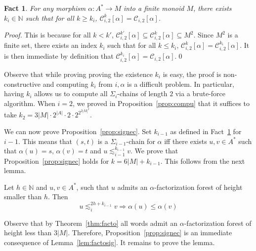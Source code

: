 \documentclass[envcountsame]{llncs}
\newcommand\nat{\ensuremath{\mathbb{N}}\xspace}
\newcommand\Cs{\ensuremath{\mathcal{C}}\xspace}
\newcommand\Csgen[3]{\ensuremath{\Cs_{#1,#3}^{#2}}\xspace}
\newcommand\Csitwo{\ensuremath{\Cs_{i,2}}\xspace}
\newcommand{\sic}[1]{\ensuremath{\Sigma_{#1}}\xspace}
\newcommand\sieq[2]{\ensuremath{\lesssim^{#1}_{#2}}\xspace}
\newcommand\lmo{\ensuremath{\leqslant}\xspace}
\let\leq\leqslant
\let\geq\geqslant
\newcommand\qchain[1]{\ensuremath{\sic{#1}}-chain\xspace}
\newcommand\qchains[1]{\ensuremath{\sic{#1}}-chains\xspace}
\newcommand\ichains{\qchains{i}}
\newtheorem{fact}[theorem]{Fact}
\begin{document}
\begin{fact} \label{fct:boundk}
  For any morphism $\alpha: A^* \rightarrow M$ into a finite monoid $M$,
  there exists $k_i \in \nat$ such that for all $k \geq k_i$,
  $\Csgen{i}{k}{2}[\alpha] = \Csitwo[\alpha]$.
\end{fact}

\begin{proof}
  This is because for all $k < k'$, $\Csgen{i}{k'}{2}[\alpha] \subseteq
  \Csgen{i}{k}{2}[\alpha] \subseteq M^2$. Since $M^2$ is a finite set, there
  exists an index $k_i$ such that for all $k \leq k_i$,
  $\Csgen{i}{k}{2}[\alpha] = \Csgen{i}{k_i}{2}[\alpha]$. It is then
  immediate by definition that $\Csgen{i}{k_i}{2}[\alpha] = \Csitwo[\alpha]$.\qed
\end{proof}

Observe that while proving proving the existence $k_i$ is easy, the
proof is non-constructive and computing $k_i$ from $i,\alpha$ is a
difficult problem. In particular, having $k_i$ allows us to compute all
\ichains of length $2$ via a brute-force algorithm. When $i=2$, we
proved in Proposition~\ref{prop:compu} that it suffices to take $k_2 =
3|M| \cdot 2^{|A|} \cdot 2 \cdot  2^{2^{2|M|^2}}$.

We can now prove Proposition~\ref{prop:signec}. Set $k_{i-1}$ as defined
in Fact~\ref{fct:boundk} for $i-1$. This means that $(s,t)$ is a
\qchain{i-1} for $\alpha$ iff there exists $u,v \in A^*$ such that
$\alpha(u) = s$, $\alpha(v)=t$ and $u \sieq{k_{i-1}}{i-1} v$. We prove
that Proposition~\ref{prop:signec} holds for $k = 6|M|+k_{i-1}$. This
follows from the next lemma.


\begin{lemma} \label{lem:factosig}
  Let $h \in \nat$ and $u,v \in A^*$, such that $u$ admits an
  $\alpha$-factorization forest of height smaller than $h$. Then  
  \[
  u \sieq{2h+k_{i-1}}{i} v \Rightarrow \alpha(u) \lmo \alpha(v)
  \]
\end{lemma}

Observe that by Theorem~\ref{thm:facto} all words admit an
$\alpha$-factorization forest of height less than $3|M|$. Therefore,
Proposition~\ref{prop:signec} is an immediate consequence of
Lemma~\ref{lem:factosig}. It remains to prove the lemma.
\end{document}
